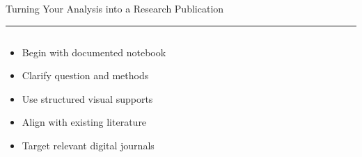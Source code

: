 \documentclass[aspectratio=169]{beamer}
\newcommand{\TitleFont}{\rmfamily}
\begin{document}
\begin{frame}[t]{}
  \vspace*{0.5cm}
  {\TitleFont\fontsize{18}{22}\selectfont\color{LUBronze}Turning Your Analysis into a Research Publication\par}
  \vspace{0.3em}
  {\color{LUBronze}\rule{\linewidth}{0.8pt}}\par
  \vspace{0.2cm}
  \begin{columns}[t]
    \begin{column}[t]{0.4\textwidth}
      \vspace*{0pt}
      \begin{itemize}\setlength\itemsep{0.65em}
        \item Begin with documented notebook
        \item Clarify question and methods
        \item Use structured visual supports
        \item Align with existing literature
        \item Target relevant digital journals
      \end{itemize}
    \end{column}
  \end{columns}
\end{frame}
\end{document}
